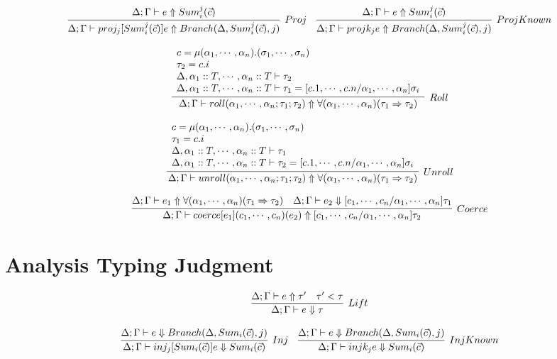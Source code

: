 \documentclass{article}
\begin{document}
$$
\infer[Proj]{\Delta; \Gamma \vdash \Proj{j}{\KSum{i}{\vec c}{j}}{e} \Uparrow Branch(\Delta, \KSum{i}{\vec c}{j}, j)}
{
	\Delta; \Gamma \vdash e \Uparrow \KSum{i}{\vec c}{j}
}
\quad
\infer[ProjKnown]{\Delta; \Gamma \vdash \KProj{j}{e} \Uparrow Branch(\Delta, \KSum{i}{\vec c}{j}, j)}
{
	\Delta; \Gamma \vdash e \Uparrow \KSum{i}{\vec c}{j}
}
$$

$$
\infer[Roll]{\Delta; \Gamma \vdash \Roll{\alpha_1,\cdots,\alpha_n}{\tau_1}{\tau_2} \Uparrow \Coercion{\alpha_1,\cdots,\alpha_n}{\tau_1}{\tau_2}}
{
	\begin{array}{l}
		c = \Rec{\alpha_1,\cdots,\alpha_n}{\sigma_1,\cdots,\sigma_n} \\
		\tau_2 = c.i \\
		\Delta, \alpha_1::T, \cdots, \alpha_n::T \vdash \tau_2 \\
		\Delta, \alpha_1::T, \cdots, \alpha_n::T \vdash \tau_1 = [c.1,\cdots,c.n/\alpha_1,\cdots,\alpha_n]\sigma_i
	\end{array}
}
$$

$$
\infer[Unroll]{\Delta; \Gamma \vdash \Unroll{\alpha_1,\cdots,\alpha_n}{\tau_1}{\tau_2} \Uparrow \Coercion{\alpha_1,\cdots,\alpha_n}{\tau_1}{\tau_2}}
{
	\begin{array}{l}
		c = \Rec{\alpha_1,\cdots,\alpha_n}{\sigma_1,\cdots,\sigma_n} \\
		\tau_1 = c.i \\
		\Delta, \alpha_1::T, \cdots, \alpha_n::T \vdash \tau_1 \\
		\Delta, \alpha_1::T, \cdots, \alpha_n::T \vdash \tau_2 = [c.1,\cdots,c.n/\alpha_1,\cdots,\alpha_n]\sigma_i
	\end{array}
}
$$

$$
\infer[Coerce]{\Delta; \Gamma \vdash \Coerce{e_1}{c_1,\cdots,c_n}{e_2} \Uparrow [c_1,\cdots,c_n/\alpha_1,\cdots,\alpha_n]\tau_2}
{
	\Delta; \Gamma \vdash e_1 \Uparrow \Coercion{\alpha_1,\cdots,\alpha_n}{\tau_1}{\tau_2}
	\quad \Delta; \Gamma \vdash e_2 \Downarrow [c_1,\cdots,c_n/\alpha_1,\cdots,\alpha_n]\tau_1
}
$$

\section{Analysis Typing Judgment}

$$
\infer[Lift]{\Delta; \Gamma \vdash e \Downarrow \tau}
{
	\Delta; \Gamma \vdash e \Uparrow \tau'
	\quad \tau' < \tau
}
$$

$$
\infer[Inj]{\Delta; \Gamma \vdash \Inj{j}{\Sum{i}{\vec c}}{e} \Downarrow \Sum{i}{\vec c}}
{
	\Delta; \Gamma \vdash e \Downarrow Branch(\Delta, \Sum{i}{\vec c}, j)
}
\quad
\infer[InjKnown]{\Delta; \Gamma \vdash \KInj{j}{e} \Downarrow \Sum{i}{\vec c}}
{
	\Delta; \Gamma \vdash e \Downarrow Branch(\Delta, \Sum{i}{\vec c}, j)
}
$$
\end{document}
